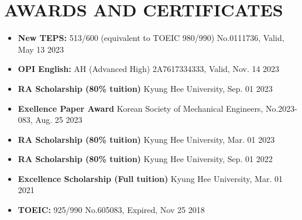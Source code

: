 \documentclass[a4paper,10pt]{extarticle}
\begin{document}
\section*{AWARDS AND CERTIFICATES}
\begin{itemize}
	\item \textbf{New TEPS:} 513/600 (equivalent to TOEIC 980/990) \hfill No.0111736, Valid, May 13 2023

	\item \textbf{OPI English:} AH (Advanced High) \hfill 2A7617334333, Valid, Nov. 14 2023
	\item \textbf{RA Scholarship (80\% tuition)} \hfill Kyung Hee University, Sep. 01 2023
	\item \textbf{Exellence Paper Award} \hfill Korean Society of Mechanical Engineers, No.2023-083, Aug. 25 2023
	\item \textbf{RA Scholarship (80\% tuition)} \hfill Kyung Hee University, Mar. 01 2023
	\item \textbf{RA Scholarship (80\% tuition)} \hfill Kyung Hee University, Sep. 01 2022
	\item \textbf{Excellence Scholarship (Full tuition)} \hfill Kyung Hee University, Mar. 01 2021
	\item \textbf{TOEIC:} 925/990 \hfill No.605083, Expired, Nov 25 2018
\end{itemize}


\end{document}

